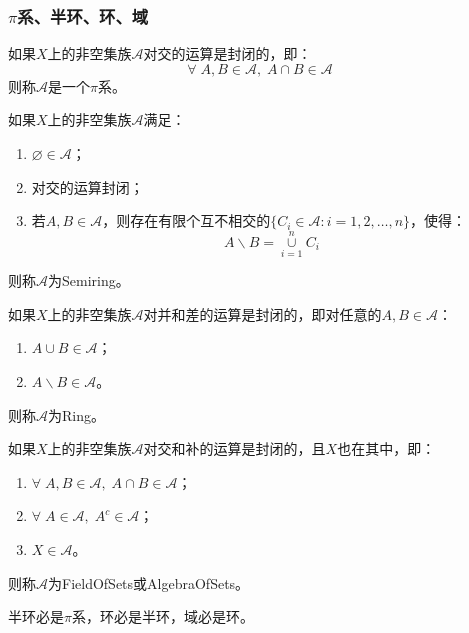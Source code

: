 \subsubsection{$\pi$系、半环、环、域}
\begin{definition}
	如果$X$上的非空集族$\mathscr{A}$对交的运算是封闭的，即：
	\begin{equation*}
		\forall\;A,B\in\mathscr{A},\;A\cap B\in\mathscr{A}
	\end{equation*}
	则称$\mathscr{A}$是一个$\pi$系。
\end{definition}
\begin{definition}
	如果$X$上的非空集族$\mathscr{A}$满足：
	\begin{enumerate}
		\item $\varnothing\in\mathscr{A}$；
		\item 对交的运算封闭；
		\item 若$A,B\in\mathscr{A}$，则存在有限个互不相交的$\{C_i\in\mathscr{A}:i=1,2,\dots,n\}$，使得：
		\begin{equation*}
			A\backslash B=\underset{i=1}{\overset{n}{\cup}}C_i
		\end{equation*}
	\end{enumerate}
	则称$\mathscr{A}$为\gls{Semiring}。
\end{definition}
\begin{definition}
	如果$X$上的非空集族$\mathscr{A}$对并和差的运算是封闭的，即对任意的$A,B\in\mathscr{A}$：
	\begin{enumerate}
		\item $A\cup B\in\mathscr{A}$；
		\item $A\backslash B\in\mathscr{A}$。
	\end{enumerate}
	则称$\mathscr{A}$为\gls{Ring}。
\end{definition}
\begin{definition}
	如果$X$上的非空集族$\mathscr{A}$对交和补的运算是封闭的，且$X$也在其中，即：
	\begin{enumerate}
		\item $\forall\;A,B\in\mathscr{A},\;A\cap B\in\mathscr{A}$；
		\item $\forall\;A\in\mathscr{A},\;A^c\in\mathscr{A}$；
		\item $X\in\mathscr{A}$。
	\end{enumerate}
	则称$\mathscr{A}$为\gls{FieldOfSets}或\gls{AlgebraOfSets}。
\end{definition}
\begin{theorem}\label{theo:SetNecessarilySet1}
	半环必是$\pi$系，环必是半环，域必是环。
\end{theorem}
